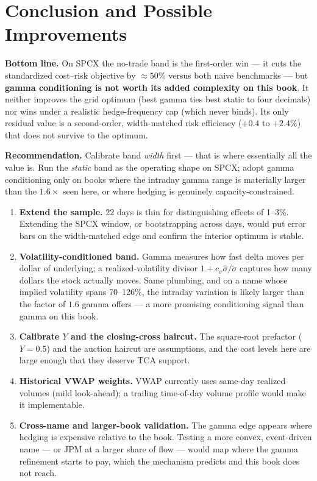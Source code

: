 \documentclass[11pt]{article}
\begin{document}
\section{Conclusion and Possible Improvements}

\textbf{Bottom line.} On SPCX the no-trade band is the first-order win --- it cuts the
standardized cost--risk objective by $\approx50\%$ versus both naive benchmarks --- but
\textbf{gamma conditioning is not worth its added complexity on this book}. It neither
improves the grid optimum (best gamma ties best static to four decimals) nor wins under a
realistic hedge-frequency cap (which never binds). Its only residual value is a second-order,
width-matched risk efficiency ($+0.4$ to $+2.4\%$) that does not survive to the optimum.

\textbf{Recommendation.} Calibrate band \emph{width} first --- that is where essentially all
the value is. Run the \emph{static} band as the operating shape on SPCX; adopt gamma
conditioning only on books where the intraday gamma range is materially larger than the
$1.6\times$ seen here, or where hedging is genuinely capacity-constrained.

\begin{enumerate}
\item \textbf{Extend the sample.} 22 days is thin for distinguishing effects of 1--3\%.
  Extending the SPCX window, or bootstrapping across days, would put error bars on the
  width-matched edge and confirm the interior optimum is stable.
\item \textbf{Volatility-conditioned band.} Gamma measures how fast delta moves per
  dollar of underlying; a realized-volatility divisor
  $1 + c_\sigma\hat\sigma/\tilde\sigma$ captures how many dollars the stock actually
  moves. Same plumbing, and on a name whose implied volatility spans 70--126\%, the
  intraday variation is likely larger than the factor of $1.6$ gamma offers --- a more
  promising conditioning signal than gamma on this book.
\item \textbf{Calibrate $Y$ and the closing-cross haircut.} The square-root prefactor
  ($Y = 0.5$) and the auction haircut are assumptions, and the cost levels here are large
  enough that they deserve TCA support.
\item \textbf{Historical VWAP weights.} VWAP currently uses same-day realized volumes
  (mild look-ahead); a trailing time-of-day volume profile would make it implementable.
\item \textbf{Cross-name and larger-book validation.} The gamma edge appears where hedging
  is expensive relative to the book. Testing a more convex, event-driven name --- or JPM at a
  larger share of flow --- would map where the gamma refinement starts to pay, which the
  mechanism predicts and this book does not reach.
\end{enumerate}
\end{document}
